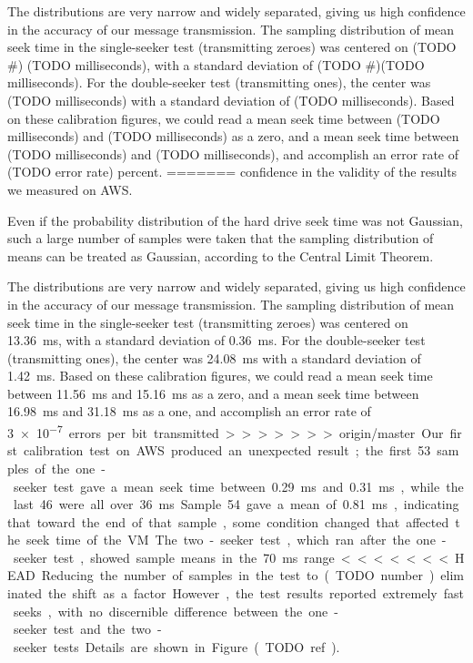 \documentclass[conference]{IEEEtran}
\begin{document}
The distributions are very narrow and widely separated, giving us high confidence in the accuracy of our message
  transmission.
The sampling distribution of mean seek time in the single-seeker test (transmitting zeroes) was centered on (TODO \#)
  (TODO milliseconds), with a standard deviation of (TODO \#)(TODO milliseconds).
For the double-seeker test (transmitting ones), the center was (TODO milliseconds) with a standard deviation of (TODO
  milliseconds).
Based on these calibration figures, we could read a mean seek time between (TODO milliseconds) and (TODO milliseconds)
  as a zero, and a mean seek time between (TODO milliseconds) and (TODO milliseconds), and accomplish an error rate of
  (TODO error rate) percent.
=======
  confidence in the validity of the results we measured on AWS.

Even if the probability distribution of the hard drive seek time was not Gaussian, such a large number of samples were
  taken that the sampling distribution of means can be treated as Gaussian, according to the Central Limit Theorem.

The distributions are very narrow and widely separated, giving us high confidence in the accuracy of our message
  transmission.
The sampling distribution of mean seek time in the single-seeker test (transmitting zeroes) was centered on
  \SI{13.36}{ms}, with a standard deviation of \SI{0.36}{ms}.
For the double-seeker test (transmitting ones), the center was \SI{24.08}{ms} with a standard deviation of
  \SI{1.42}{ms}.
Based on these calibration figures, we could read a mean seek time between \SI{11.56}{ms} and \SI{15.16}{ms}
  as a zero, and a mean seek time between \SI{16.98}{ms} and \SI{31.18}{ms} as a one, and accomplish an error rate of
  \SI{3e-7} errors per bit transmitted.
>>>>>>> origin/master

Our first calibration test on AWS produced an unexpected result; the first \num{53} samples of the one-seeker test gave
  a mean seek time between \SI{0.29}{ms} and \SI{0.31}{ms}, while the last \num{46} were all over \SI{36}{ms}.
Sample \num{54} gave a mean of \SI{0.81}{ms}, indicating that toward the end of that sample, some condition changed
  that affected the seek time of the VM.
The two-seeker test, which ran after the one-seeker test, showed sample means in the \SI{70}{ms} range.

<<<<<<< HEAD
Reducing the number of samples in the test to (TODO number) eliminated the shift as a factor.
However, the test results reported extremely fast seeks, with no discernible difference between the one-seeker test and
  the two-seeker tests.
Details are shown in Figure~(TODO ref).
\end{document}
